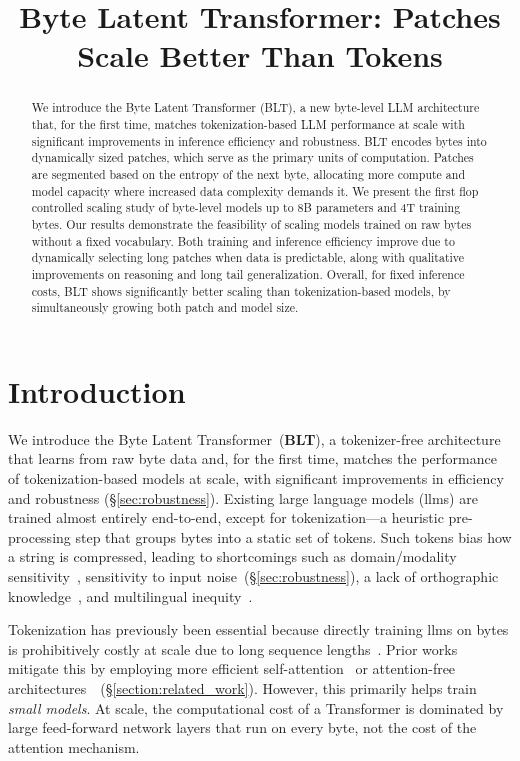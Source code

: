 \title{Byte Latent Transformer: Patches Scale Better Than Tokens}

\begin{abstract}
We introduce the Byte Latent Transformer ({\textsc BLT}), a new byte-level LLM architecture that, for the first time, matches tokenization-based LLM performance at scale with significant improvements in inference efficiency and robustness.
{\textsc BLT} encodes bytes into dynamically sized patches, which serve as the primary units of computation. Patches are segmented based on the entropy of the next byte, allocating more compute and model capacity where increased data complexity demands it. We present the first flop controlled scaling study of byte-level models up to 8B parameters and 4T training bytes. Our results demonstrate the feasibility of scaling models trained on raw bytes without a fixed vocabulary. Both training and inference efficiency improve due to dynamically selecting long patches when data is predictable, along with qualitative improvements on reasoning and long tail generalization. Overall, for fixed inference costs, {\textsc BLT} shows significantly better scaling than tokenization-based models, by simultaneously growing both patch and model size.
\end{abstract}

\section{Introduction}
\label{section:intro}

We introduce the Byte Latent Transformer~(\textbf{BLT}), a tokenizer-free architecture that learns from raw byte data and, for the first time, matches the performance of tokenization-based models at scale, with significant improvements in efficiency and robustness (\S\ref{sec:robustness}).
Existing large language models (llms) are trained almost entirely end-to-end, except for tokenization---a heuristic pre-processing step that groups bytes into a static set of tokens. Such tokens bias how a string is compressed, leading to shortcomings such as domain/modality sensitivity~\citep{dagangetting}, sensitivity to input noise~(\S\ref{sec:robustness}), a lack of orthographic knowledge~\citep{edman2024cute}, and multilingual inequity~\citep{liang2023xlm,petrov2024language,limisiewicz2024myte}. 

Tokenization has previously been essential because directly training llms on bytes is prohibitively costly at scale due to long sequence lengths~\citep{xue2022byt5}. Prior works mitigate this by employing more efficient self-attention~\citep{el2020characterbert, clark2022canine} or attention-free architectures~\citep{wang2024mambabyte}~(\S\ref{section:related_work}). However, this primarily helps train \textit{small models}. At scale, the computational cost of a Transformer is dominated by large feed-forward network layers that run on every byte, not the cost of the attention mechanism.

